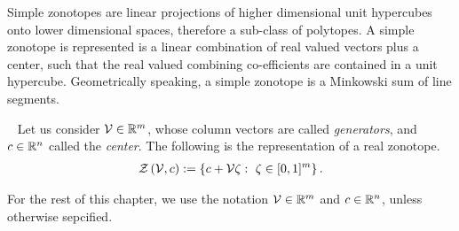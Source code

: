 
Simple zonotopes are linear
projections of higher dimensional unit hypercubes onto lower
dimensional spaces, therefore a sub-class of polytopes.  A simple
zonotope is represented is a linear combination of real valued vectors
plus a center, such that the real valued combining co-efficients are
contained in a unit hypercube.  Geometrically speaking, a simple
zonotope is a Minkowski sum of line segments.
%
\begin{definition}~\label{defn:rztope}
Let us consider $\mathcal{V}\in\mathbb{R}^m$, whose column vectors are called
\emph{generators}, and $c\in\mathbb{R}^n$ called the \emph{center}.  The following is the
representation of a real zonotope.
%
\begin{align*}
\mathit{\mathcal{Z}}\left(\mathcal{V},c\right):=\left\{c+\mathcal{V}\zeta:~\zeta\in[0,1]^m\right\}.
\end{align*}
%
\end{definition}
%
For the rest of this chapter, we
use the notation $\mathcal{V}\in\mathbb{R}^m$ and $c\in\mathbb{R}^n$, unless
otherwise sepcified.

